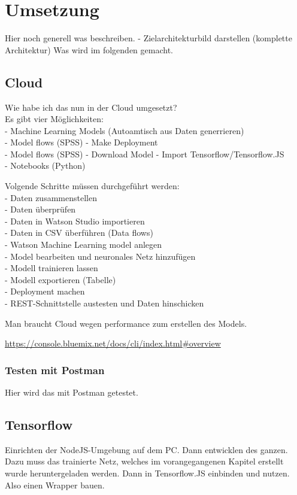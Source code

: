 \section{Umsetzung}
Hier noch generell was beschreiben. - Zielarchitekturbild darstellen (komplette Architektur)
Was wird im folgenden gemacht.

\subsection{Cloud}
Wie habe ich das nun in der Cloud umgesetzt?\\
Es gibt vier Möglichkeiten:\\
- Machine Learning Models (Autoamtisch aus Daten generrieren)\\
- Model flows (SPSS) - Make Deployment\\
- Model flows (SPSS) - Download Model - Import Tensorflow/Tensorflow.JS\\
- Notebooks (Python)

Volgende Schritte müssen durchgeführt werden:\\
- Daten zusammenstellen\\
- Daten überprüfen\\
- Daten in Watson Studio importieren\\
- Daten in CSV überführen (Data flows)\\
- Watson Machine Learning model anlegen\\
- Model bearbeiten und neuronales Netz hinzufügen\\
- Modell trainieren lassen\\
- Modell exportieren (Tabelle)\\
- Deployment machen\\
- REST-Schnittstelle austesten und Daten hinschicken

Man braucht Cloud wegen performance zum erstellen des Models.

\url{https://console.bluemix.net/docs/cli/index.html#overview}

\subsubsection{Testen mit Postman}
Hier wird das mit Postman getestet.

\subsection{Tensorflow}
Einrichten der NodeJS-Umgebung auf dem PC. Dann entwicklen des ganzen. Dazu muss das trainierte Netz, welches im
vorangegangenen Kapitel erstellt wurde heruntergeladen werden. Dann in Tensorflow.JS einbinden und nutzen. Also einen
Wrapper bauen.

